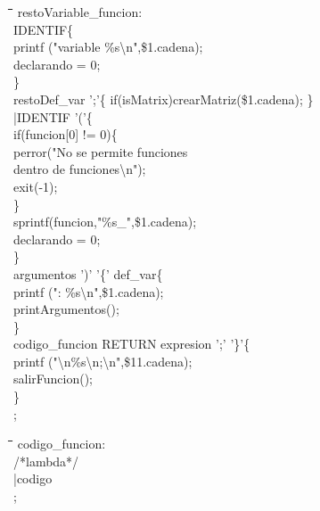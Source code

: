 \documentclass[11pt,spanish]{article}
\begin{document}
		\begin{tcolorbox}
		\begin{tabbing}
			\hspace*{0.5cm}\=\hspace*{0.5cm}\= \hspace*{6cm}\=\hspace*{1cm}\=\hspace*{0.5cm}\=\hspace*{0.5cm}\=\kill
			restoVariable\_funcion:\\
			\>IDENTIF\>\>\{\\
			\>\>\>\>printf ("variable \%s\textbackslash n",\$1.cadena);\\
			\>\>\>\>declarando = 0;\\
			\>\>\>\} \\
			\>restoDef\_var ';'\>\>\{ if(isMatrix)crearMatriz(\$1.cadena); \}\\
			|IDENTIF '('\>\>\>\{\\
			\>\>\>\>if(funcion[0] != 0)\{\\
			\>\>\>\>\>perror("No se permite funciones\\
			\>\>\>\>\>\>dentro de funciones\textbackslash n");\\
			\>\>\>\>\>exit(-1);\\
			\>\>\>\}\\
			\>\>\>\>sprintf(funcion,"\%s\_",\$1.cadena);\\
			\>\>\>\>declarando = 0;\\
			\>\>\>\}\\
			\>\>argumentos ')' '\{' def\_var\>\{\\
			\>\>\>\>printf (": \%s\textbackslash n",\$1.cadena);\\
			\>\>\>\>printArgumentos();\\
			\>\>\>\}\\
			codigo\_funcion  RETURN expresion ';' '\}'\>\>\>\{\\
			\>\>\>\>printf ("\textbackslash n\%s\textbackslash n;\textbackslash n",\$11.cadena);\\
			\>\>\>\>salirFuncion();\\
			\>\>\>\}\\
			;
		\end{tabbing}
		\end{tcolorbox}
		\begin{tcolorbox}
		\begin{tabbing}
		\hspace*{0.5cm}\=\hspace*{0.5cm}\= \hspace*{6cm}\=\hspace*{1cm}\=\hspace*{0.5cm}\=\kill
			codigo\_funcion:\\
			\>/*lambda*/\\
			\>|codigo\\
			;
		\end{tabbing}
		\end{tcolorbox}
\end{document}
